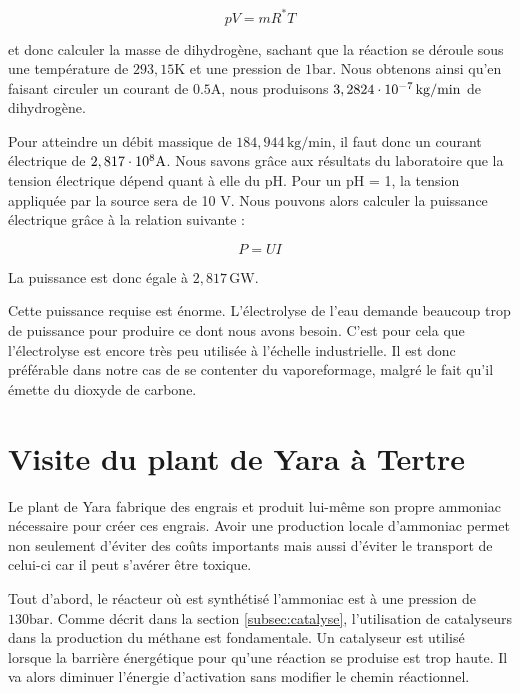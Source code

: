 \begin{equation*}
	pV = mR^{*}T
\end{equation*}

et donc calculer la masse de dihydrogène, sachant que la réaction se déroule 
sous une température de $293,15 \si{\kelvin}$ et une pression de $1 \si{\bar}$. 
Nous obtenons ainsi qu'en faisant circuler un courant de $0.5 \si{\ampere}$, 
nous produisons $3,2824\cdot 10^{-7} \, \si{\kilo\gram/\minute}$ de dihydrogène.

Pour atteindre un débit massique de $184,944 \, \si{\kilo\gram/\minute}$, 
il faut donc un courant électrique de $2,817\cdot 10^{8} \si{\ampere}$. 
Nous savons grâce aux résultats du laboratoire que la tension électrique dépend quant à elle du pH. 
Pour un pH = 1, la tension appliquée par la source sera de 10 V.
Nous pouvons alors calculer la puissance électrique grâce à la relation suivante : 

\begin{equation*}
	P = UI
\end{equation*}

La puissance est donc égale à $2,817 \, \si{\giga\watt}$.

Cette puissance requise est énorme. L'électrolyse de l'eau demande 
beaucoup trop de puissance pour produire ce dont nous avons besoin. 
C'est pour cela que l'électrolyse est encore très peu utilisée à l'échelle industrielle. 
Il est donc préférable dans notre cas de se contenter du vaporeformage, 
malgré le fait qu'il émette du dioxyde de carbone.

\section{Visite du plant de Yara à Tertre}

Le plant de Yara fabrique des engrais et produit lui-même son propre ammoniac nécessaire
pour créer ces engrais. Avoir une production locale d'ammoniac permet non seulement 
d'éviter des coûts importants mais aussi d'éviter le transport de celui-ci car il 
peut s'avérer être toxique.

Tout d'abord, le réacteur où est synthétisé l'ammoniac est à une pression de $130 \si{\bar}$.
Comme décrit dans la section \ref{subsec:catalyse}, l'utilisation de catalyseurs dans la
production du méthane est fondamentale. Un catalyseur est utilisé lorsque la 
barrière énergétique pour qu'une réaction se produise est trop haute. Il va alors 
diminuer l'énergie d'activation sans modifier le chemin réactionnel.

